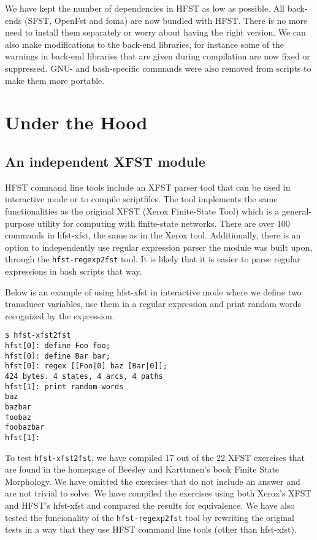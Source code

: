 \documentclass{llncs}
\begin{document}
We have kept the number of dependencies in HFST as low as possible.
All back-ends (SFST, OpenFst and foma) are now bundled with
HFST. There is no more need to install them separately or worry about
having the right version. We can also make modifications to the
back-end libraries, for instance some of the warnings in back-end
libraries that are given during compilation are now fixed or
suppressed. GNU- and bash-specific commands were also removed from
scripts to make them more portable.

\section{Under the Hood}

\subsection{An independent XFST module}

HFST command line tools include an XFST parser tool that can be used
in interactive mode or to compile scriptfiles. The tool implements the
same functionalities as the original XFST (Xerox Finite-State Tool)
which is a general-purpose utility for computing with finite-state
networks. There are over 100 commands in hfst-xfst, the same as in the
Xerox tool. Additionally, there is an option to independently use
regular expression parser the module was built upon, through the
\verb+hfst-regexp2fst+ tool. It is likely that it is easier to parse
regular expressions in bash scripts that way.

Below is an example of using hfst-xfst in interactive
mode where we define two transducer variables, use them in a regular
expression and print random words recognized by the expression.

\begin{verbatim}
$ hfst-xfst2fst 
hfst[0]: define Foo foo;
hfst[0]: define Bar bar;
hfst[0]: regex [[Foo|0] baz [Bar|0]];
424 bytes. 4 states, 4 arcs, 4 paths
hfst[1]: print random-words
baz
bazbar
foobaz
foobazbar
hfst[1]: 
\end{verbatim}

To test \verb+hfst-xfst2fst+, we have compiled 17 out of the 22 XFST exercises
that are found in the homepage of Beesley and Karttunen's book Finite
State Morphology. We have omitted the exercises that do not include an
answer and are not trivial to solve. We have compiled the exercises
using both Xerox's XFST and HFST's hfst-xfst and compared the results
for equivalence. We have also tested the funcionality of the
\verb+hfst-regexp2fst+ tool by rewriting the original tests in a way that they
use HFST command line tools (other than hfst-xfst).
\end{document}
